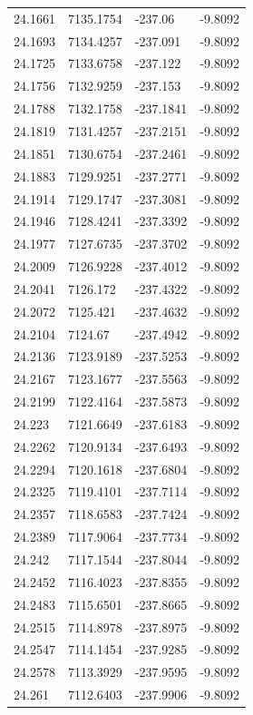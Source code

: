 \begin{table}[H]
\begin{tabular}{llll}
24.1661 & 7135.1754 & -237.06 & -9.8092 \\
24.1693 & 7134.4257 & -237.091 & -9.8092 \\
24.1725 & 7133.6758 & -237.122 & -9.8092 \\
24.1756 & 7132.9259 & -237.153 & -9.8092 \\
24.1788 & 7132.1758 & -237.1841 & -9.8092 \\
24.1819 & 7131.4257 & -237.2151 & -9.8092 \\
24.1851 & 7130.6754 & -237.2461 & -9.8092 \\
24.1883 & 7129.9251 & -237.2771 & -9.8092 \\
24.1914 & 7129.1747 & -237.3081 & -9.8092 \\
24.1946 & 7128.4241 & -237.3392 & -9.8092 \\
24.1977 & 7127.6735 & -237.3702 & -9.8092 \\
24.2009 & 7126.9228 & -237.4012 & -9.8092 \\
24.2041 & 7126.172 & -237.4322 & -9.8092 \\
24.2072 & 7125.421 & -237.4632 & -9.8092 \\
24.2104 & 7124.67 & -237.4942 & -9.8092 \\
24.2136 & 7123.9189 & -237.5253 & -9.8092 \\
24.2167 & 7123.1677 & -237.5563 & -9.8092 \\
24.2199 & 7122.4164 & -237.5873 & -9.8092 \\
24.223 & 7121.6649 & -237.6183 & -9.8092 \\
24.2262 & 7120.9134 & -237.6493 & -9.8092 \\
24.2294 & 7120.1618 & -237.6804 & -9.8092 \\
24.2325 & 7119.4101 & -237.7114 & -9.8092 \\
24.2357 & 7118.6583 & -237.7424 & -9.8092 \\
24.2389 & 7117.9064 & -237.7734 & -9.8092 \\
24.242 & 7117.1544 & -237.8044 & -9.8092 \\
24.2452 & 7116.4023 & -237.8355 & -9.8092 \\
24.2483 & 7115.6501 & -237.8665 & -9.8092 \\
24.2515 & 7114.8978 & -237.8975 & -9.8092 \\
24.2547 & 7114.1454 & -237.9285 & -9.8092 \\
24.2578 & 7113.3929 & -237.9595 & -9.8092 \\
24.261 & 7112.6403 & -237.9906 & -9.8092 \\

\end{tabular}
\end{table}
